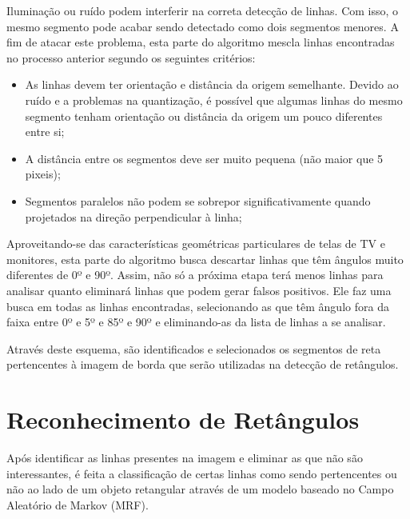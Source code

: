
Iluminação ou ruído podem interferir na correta detecção de linhas. Com isso, o mesmo segmento pode acabar sendo detectado como dois segmentos menores. A fim de atacar este problema, esta parte do algoritmo mescla linhas encontradas no processo anterior segundo os seguintes critérios:
\begin{itemize}
\item As linhas devem ter orientação e distância da origem semelhante. Devido ao ruído e a problemas na quantização, é possível que algumas linhas do mesmo segmento tenham orientação ou distância da origem um pouco diferentes entre si;
\item A distância entre os segmentos deve ser muito pequena (não maior que 5 pixeis);
\item Segmentos paralelos não podem se sobrepor significativamente quando projetados na direção perpendicular à linha;
\end{itemize}



Aproveitando-se das características geométricas particulares de telas de TV e monitores, esta parte do algoritmo busca descartar linhas que têm ângulos muito diferentes de 0º e 90º. Assim, não só a próxima etapa terá menos linhas para analisar quanto eliminará linhas que podem gerar falsos positivos.
Ele faz uma busca em todas as linhas encontradas, selecionando as que têm ângulo fora da faixa entre 0º e 5º e 85º e 90º e eliminando-as da lista de linhas a se analisar.

Através deste esquema, são identificados e selecionados os segmentos de reta pertencentes à imagem de borda que serão utilizadas na detecção de retângulos.





\section{Reconhecimento de Retângulos}

Após identificar as linhas presentes na imagem e eliminar as que não são interessantes, é feita a classificação de certas linhas como sendo pertencentes ou não ao lado de um objeto retangular através de um modelo baseado no Campo Aleatório de Markov (MRF).

